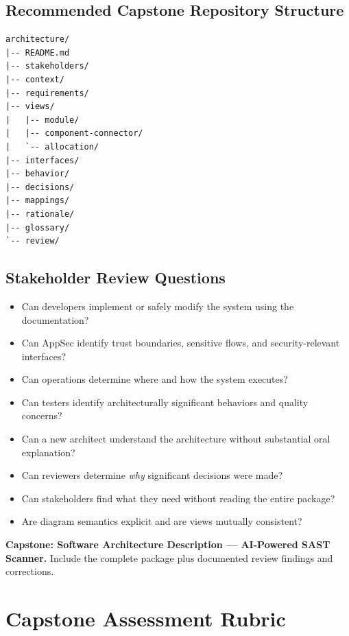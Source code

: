 \documentclass[10pt,letterpaper]{article}
\begin{document}
\subsection{Recommended Capstone Repository Structure}
\begin{lstlisting}
architecture/
|-- README.md
|-- stakeholders/
|-- context/
|-- requirements/
|-- views/
|   |-- module/
|   |-- component-connector/
|   `-- allocation/
|-- interfaces/
|-- behavior/
|-- decisions/
|-- mappings/
|-- rationale/
|-- glossary/
`-- review/
\end{lstlisting}

\subsection{Stakeholder Review Questions}
\begin{itemize}
  \item Can developers implement or safely modify the system using the documentation?
  \item Can AppSec identify trust boundaries, sensitive flows, and security-relevant interfaces?
  \item Can operations determine where and how the system executes?
  \item Can testers identify architecturally significant behaviors and quality concerns?
  \item Can a new architect understand the architecture without substantial oral explanation?
  \item Can reviewers determine \emph{why} significant decisions were made?
  \item Can stakeholders find what they need without reading the entire package?
  \item Are diagram semantics explicit and are views mutually consistent?
\end{itemize}

\begin{deliverablebox}
\textbf{Capstone: Software Architecture Description --- AI-Powered SAST Scanner.} Include the complete package plus documented review findings and corrections.
\end{deliverablebox}

\section{Capstone Assessment Rubric}
\end{document}
